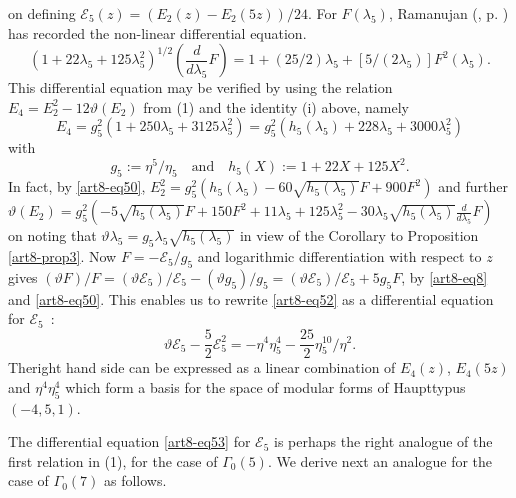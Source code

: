 on defining $\mathscr{E}_{5}(z)=(E_{2}(z)-E_{2}(5z))/24$. For $F(\lambda_{5})$, Ramanujan (\cite{art8-key11}, p. ) has recorded the non-linear differential equation.
\begin{equation}
(1+22\lambda_{5}+125\lambda^{2}_{5})^{1/2}\left(\frac{d}{d\lambda_{5}}F\right)=1+(25/2)\lambda_{5}+[5/(2\lambda_{5})]F^{2}(\lambda_{5}).\label{art8-eq52}
\end{equation}
This differential equation may be verified by using the relation $E_{4}=E^{2}_{2}-12\vartheta(E_{2})$ from (1) and the identity (i) above, namely
$$
E_{4}=g^{2}_{5}(1+250\lambda_{5}+3125\lambda^{2}_{5})=g^{2}_{5}(h_{5}(\lambda_{5})+228\lambda_{5}+3000\lambda_{5}^{2})
$$
with
$$
g_{5}:=\eta^{5}/\eta_{5}\quad\text{and}\quad h_{5}(X):=1+22X+125X^{2}.
$$
In fact, by \eqref{art8-eq50}, $E^{2}_{2}=g^{2}_{5}(h_{5}(\lambda_{5})-60\sqrt{h_{5}(\lambda_{5})}F+900F^{2})$ and further $\vartheta(E_{2})=g^{2}_{5}(-5\sqrt{h_{5}(\lambda_{5})}F+150F^{2}+11\lambda_{5}+125\lambda^{2}_{5}-30\lambda_{5}\sqrt{h_{5}(\lambda_{5})}\frac{d}{d\lambda_{5}}F)$ on noting that $\vartheta\lambda_{5}=g_{5}\lambda_{5}\sqrt{h_{5}(\lambda_{5})}$ in view of the Corollary to Proposition \ref{art8-prop3}. Now $F=-\mathscr{E}_{5}/g_{5}$ and logarithmic differentiation with respect to $z$ gives $(\vartheta F)/F=(\vartheta\mathscr{E}_{5})/\mathscr{E}_{5}-(\vartheta g_{5})/g_{5}=(\vartheta\mathscr{E}_{5})/\mathscr{E}_{5}+5g_{5}F$, by \eqref{art8-eq8} and \eqref{art8-eq50}. This enables us to rewrite \eqref{art8-eq52} as a differential equation for $\mathscr{E}_{5}$~:
\begin{equation}
\vartheta\mathscr{E}_{5}-\frac{5}{2}\mathscr{E}^{2}_{5}=-\eta^{4}\eta^{4}_{5}-\frac{25}{2}\eta^{10}_{5}/\eta^{2}.\label{art8-eq53}
\end{equation}
The\pageoriginale right hand side can be expressed as a linear combination of $E_{4}(z)$, $E_{4}(5z)$ and $\eta^{4}\eta^{4}_{5}$ which form a basis for the space of modular forms of Haupttypus $(-4,5,1)$.

\begin{remark*}
The differential equation \eqref{art8-eq53} for $\mathscr{E}_{5}$ is perhaps the right analogue of the first relation in (1), for the case of $\Gamma_{0}(5)$. We derive next an analogue for the case of $\Gamma_{0}(7)$ as follows.
\end{remark*}

